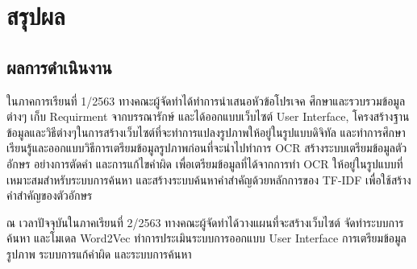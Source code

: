 \chapter{สรุปผล}

\section{ผลการดำเนินงาน}
ในภาคการเรียนที่ 1/2563 ทางคณะผู้จัดทำได้ทำการนำเสนอหัวข้อโปรเจค ศึกษาและรวบรวมข้อมูลต่างๆ เก็บ Requirment จากบรรณารักษ์ และได้ออกแบบเว็บไซต์ User Interface, 
โครงสร้างฐานข้อมูลและวิธีต่างๆในการสร้างเว็บไซต์ที่จะทำการแปลงรูปภาพให้อยู่ในรูปแบบดิจิทัล 
และทำการศึกษา เรียนรู้และออกแบบวิธีการเตรียมข้อมูลรูปภาพก่อนที่จะนำไปทำการ OCR สร้างระบบเตรียมข้อมูลตัวอักษร อย่างการตัดคำ และการแก้ไขคำผิด เพื่อเตรียมข้อมูลที่ได้จากการทำ OCR 
ให้อยู่ในรูปแบบที่เหมาะสมสำหรับระบบการค้นหา และสร้างระบบค้นหาคำสำคัญด้วยหลักการของ TF-IDF เพื่อใช้สร้างคำสำคัญของตัวอักษร

ณ เวลาปัจจุบันในภาคเรียนที่ 2/2563 ทางคณะผู้จัดทำได้วางแผนที่จะสร้างเว็บไซต์ จัดทำระบบการค้นหา และโมเดล Word2Vec ทำการประเมินระบบการออกแบบ
 User Interface การเตรียมข้อมูลรูปภาพ ระบบการแก้คำผิด และระบบการค้นหา 

